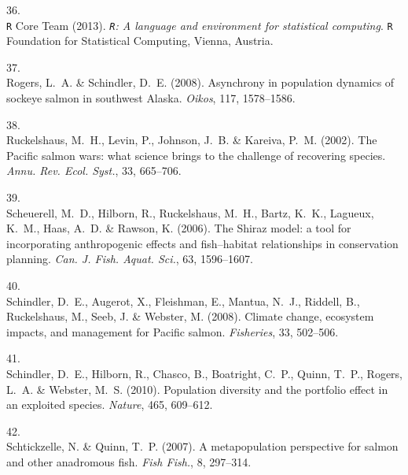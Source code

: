 \documentclass[11pt]{article}
\begin{document}
\begin{spacing}{1.6}
\begin{thebibliography}{50}
36.\\
{\texttt{R} Core Team} (2013).
\newblock \emph{\texttt{R}: {A} language and environment for statistical
  computing}.
\newblock \texttt{R} Foundation for Statistical Computing, Vienna, Austria.

37.\\
Rogers, L.~A. \& Schindler, D.~E. (2008).
\newblock Asynchrony in population dynamics of sockeye salmon in southwest
  {Alaska}.
\newblock \emph{Oikos}, 117, 1578--1586.

38.\\
Ruckelshaus, M.~H., Levin, P., Johnson, J.~B. \& Kareiva, P.~M. (2002).
\newblock The {Pacific} salmon wars: what science brings to the challenge of
  recovering species.
\newblock \emph{Annu. Rev. Ecol. Syst.}, 33, 665--706.

39.\\
Scheuerell, M.~D., Hilborn, R., Ruckelshaus, M.~H., Bartz, K.~K., Lagueux,
  K.~M., Haas, A.~D. \& Rawson, K. (2006).
\newblock The {Shiraz} model: a tool for incorporating anthropogenic effects
  and fish--habitat relationships in conservation planning.
\newblock \emph{Can. J. Fish. Aquat. Sci.}, 63, 1596--1607.

40.\\
Schindler, D.~E., Augerot, X., Fleishman, E., Mantua, N.~J., Riddell, B.,
  Ruckelshaus, M., Seeb, J. \& Webster, M. (2008).
\newblock Climate change, ecosystem impacts, and management for {Pacific}
  salmon.
\newblock \emph{Fisheries}, 33, 502--506.

41.\\
Schindler, D.~E., Hilborn, R., Chasco, B., Boatright, C.~P., Quinn, T.~P.,
  Rogers, L.~A. \& Webster, M.~S. (2010).
\newblock Population diversity and the portfolio effect in an exploited
  species.
\newblock \emph{Nature}, 465, 609--612.

42.\\
Schtickzelle, N. \& Quinn, T.~P. (2007).
\newblock A metapopulation perspective for salmon and other anadromous fish.
\newblock \emph{Fish Fish.}, 8, 297--314.


\end{thebibliography}
\end{spacing}
\end{document}
